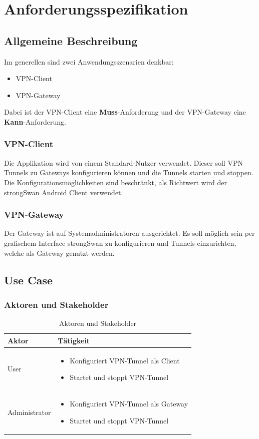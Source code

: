 \section{Anforderungsspezifikation}
\subsection{Allgemeine Beschreibung}
Im generellen sind zwei Anwendungsszenarien denkbar:
\begin{itemize}
	\item VPN-Client
	\item VPN-Gateway
\end{itemize}
\medskip
Dabei ist der VPN-Client eine \textbf{Muss}-Anforderung und der VPN-Gateway eine \textbf{Kann}-Anforderung.
\medskip
\subsubsection{VPN-Client}
Die Applikation wird von einem Standard-Nutzer verwendet. Dieser soll VPN Tunnels zu Gateways konfigurieren können und die Tunnels starten und stoppen. Die Konfigurationsmöglichkeiten sind beschränkt, als Richtwert wird der strongSwan Android Client verwendet.\\


\subsubsection{VPN-Gateway}
Der Gateway ist auf Systemadministratoren ausgerichtet. Es soll möglich sein per grafischem Interface strongSwan zu konfigurieren und Tunnels einzurichten, welche als Gateway genutzt werden. 

\subsection{Use Case}
\subsubsection{Aktoren und Stakeholder}
\begin{table}[H]
\centering
    \begin{tabular}{|p{3cm}|p{9cm}|}
    \hline
    \rowcolor{lightblue}
    Aktor & Tätigkeit   \\ \hline
	User  & 
			\begin{itemize}
			\item Konfiguriert VPN-Tunnel als Client
    		\item Startet und stoppt VPN-Tunnel
		\end{itemize}	
	\\ \hline
	Administrator & 
			\begin{itemize}
			\item Konfiguriert VPN-Tunnel als Gateway
    		\item Startet und stoppt VPN-Tunnel
		\end{itemize}	
	\\ \hline
	\end{tabular}
    \caption[Aktoren und Stakeholder]{Aktoren und Stakeholder}
\end{table}

